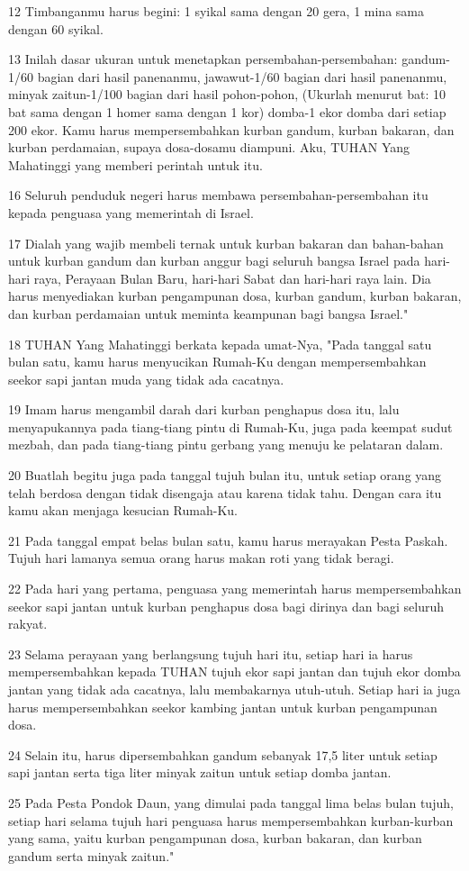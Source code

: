 \par 12 Timbanganmu harus begini: 1 syikal sama dengan 20 gera, 1 mina sama dengan 60 syikal.
\par 13 Inilah dasar ukuran untuk menetapkan persembahan-persembahan: gandum-1/60 bagian dari hasil panenanmu, jawawut-1/60 bagian dari hasil panenanmu, minyak zaitun-1/100 bagian dari hasil pohon-pohon, (Ukurlah menurut bat: 10 bat sama dengan 1 homer sama dengan 1 kor) domba-1 ekor domba dari setiap 200 ekor. Kamu harus mempersembahkan kurban gandum, kurban bakaran, dan kurban perdamaian, supaya dosa-dosamu diampuni. Aku, TUHAN Yang Mahatinggi yang memberi perintah untuk itu.
\par 16 Seluruh penduduk negeri harus membawa persembahan-persembahan itu kepada penguasa yang memerintah di Israel.
\par 17 Dialah yang wajib membeli ternak untuk kurban bakaran dan bahan-bahan untuk kurban gandum dan kurban anggur bagi seluruh bangsa Israel pada hari-hari raya, Perayaan Bulan Baru, hari-hari Sabat dan hari-hari raya lain. Dia harus menyediakan kurban pengampunan dosa, kurban gandum, kurban bakaran, dan kurban perdamaian untuk meminta keampunan bagi bangsa Israel."
\par 18 TUHAN Yang Mahatinggi berkata kepada umat-Nya, "Pada tanggal satu bulan satu, kamu harus menyucikan Rumah-Ku dengan mempersembahkan seekor sapi jantan muda yang tidak ada cacatnya.
\par 19 Imam harus mengambil darah dari kurban penghapus dosa itu, lalu menyapukannya pada tiang-tiang pintu di Rumah-Ku, juga pada keempat sudut mezbah, dan pada tiang-tiang pintu gerbang yang menuju ke pelataran dalam.
\par 20 Buatlah begitu juga pada tanggal tujuh bulan itu, untuk setiap orang yang telah berdosa dengan tidak disengaja atau karena tidak tahu. Dengan cara itu kamu akan menjaga kesucian Rumah-Ku.
\par 21 Pada tanggal empat belas bulan satu, kamu harus merayakan Pesta Paskah. Tujuh hari lamanya semua orang harus makan roti yang tidak beragi.
\par 22 Pada hari yang pertama, penguasa yang memerintah harus mempersembahkan seekor sapi jantan untuk kurban penghapus dosa bagi dirinya dan bagi seluruh rakyat.
\par 23 Selama perayaan yang berlangsung tujuh hari itu, setiap hari ia harus mempersembahkan kepada TUHAN tujuh ekor sapi jantan dan tujuh ekor domba jantan yang tidak ada cacatnya, lalu membakarnya utuh-utuh. Setiap hari ia juga harus mempersembahkan seekor kambing jantan untuk kurban pengampunan dosa.
\par 24 Selain itu, harus dipersembahkan gandum sebanyak 17,5 liter untuk setiap sapi jantan serta tiga liter minyak zaitun untuk setiap domba jantan.
\par 25 Pada Pesta Pondok Daun, yang dimulai pada tanggal lima belas bulan tujuh, setiap hari selama tujuh hari penguasa harus mempersembahkan kurban-kurban yang sama, yaitu kurban pengampunan dosa, kurban bakaran, dan kurban gandum serta minyak zaitun."

